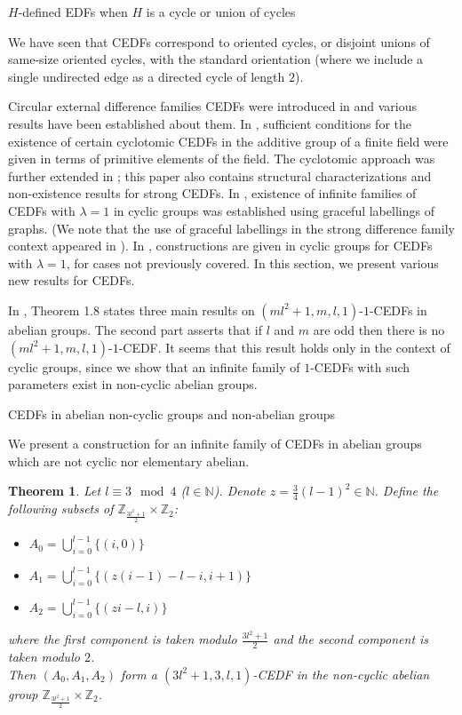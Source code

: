 \documentclass[12pt, a4paper]{article}
\newtheorem{theorem}{Theorem}[section]
\theoremstyle{definition}
\begin{document}
\begin{section}{$H$-defined EDFs when $H$ is a cycle or union of cycles}

We have seen that CEDFs correspond to oriented cycles, or disjoint unions of same-size oriented cycles, with the standard orientation (where we include a single undirected edge as a directed cycle of length $2$).  

\begin{subsection}{Circular external difference families}
CEDFs were introduced in \cite{VeiSti} and various results have been established about them.  In \cite{VeiSti}, sufficient conditions for the existence of certain cyclotomic CEDFs in the additive group of a finite field were given in terms of primitive elements of the field.  The cyclotomic approach was further extended in \cite{WuYanFen}; this paper also contains structural characterizations and non-existence results for strong CEDFs. In \cite{PatSti2}, existence of infinite families of CEDFs with $\lambda=1$ in cyclic groups was established using graceful labellings of graphs. (We note that the use of graceful labellings in the strong difference family context appeared in \cite{BurGio}).  In \cite{BurMerTra}, constructions are given in cyclic groups for CEDFs with $\lambda=1$, for cases not previously covered.  In this section, we present various new results for CEDFs.

In \cite{PatSti2}, Theorem 1.8 states three main results on $(ml^2+1,m,l,1)$-$1$-CEDFs in abelian groups.  The second part asserts that if $l$ and $m$ are odd then there is no $(ml^2 + 1, m, l, 1)$-$1$-CEDF.  It seems that this result holds only in the context of cyclic groups, since we show that an infinite family of $1$-CEDFs with such parameters exist in non-cyclic abelian groups.

\begin{subsection}{CEDFs in abelian non-cyclic groups and non-abelian groups}

We present a construction for an infinite family of CEDFs in abelian groups which are not cyclic nor elementary abelian.

\begin{theorem}\label{thm:noncyclic}
Let $l \equiv 3 \mod 4$ ($l \in \mathbb{N}$). Denote $z=\frac{3}{4}(l-1)^2 \in \mathbb{N}$. Define the following subsets of $\mathbb{Z}_{\frac{3l^2+1}{2}}\times\mathbb{Z}_2$:
\begin{itemize}
\item $A_0=\bigcup_{i=0}^{l-1}\{(i,0)\}$
\item $A_1=\bigcup_{i=0}^{l-1}\{(z(i-1)-l-i,i+1)\}$
\item $A_2=\bigcup_{i=0}^{l-1}\{(zi-l,i) \}$
\end{itemize}
where the first component is taken modulo $\frac{3l^2+1}{2}$ and the second component is taken modulo $2$.\\
Then $(A_0,A_1,A_2)$ form a $(3l^2+1,3,l,1)$-CEDF in the non-cyclic abelian group $\mathbb{Z}_{\frac{3l^2+1}{2}}\times\mathbb{Z}_2$.
\end{theorem}


\end{subsection}
\end{subsection}
\end{section}
\end{document}

